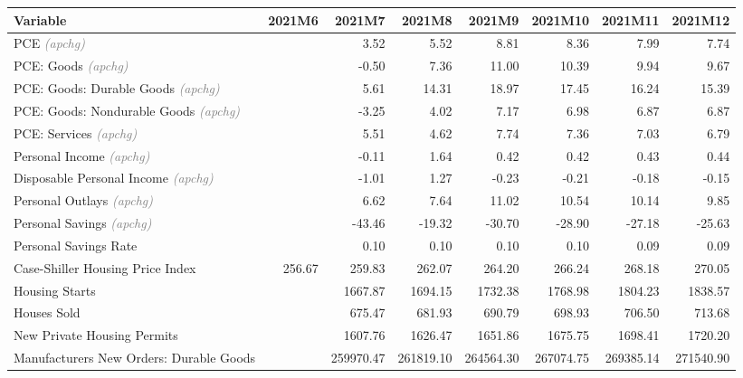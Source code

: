 \documentclass[11pt, letterpaper]{article}\usepackage[]{graphicx}\usepackage[]{color}
\begin{document}
\begin{table}[H]
\centering
\begingroup\fontsize{10pt}{12pt}\selectfont
\begin{tabular}{lrrrrrrr}
  \hline
Variable & 2021M6 & 2021M7 & 2021M8 & 2021M9 & 2021M10 & 2021M11 & 2021M12 \\ 
  \hline
PCE \textit{\footnotesize\textcolor{gray}{(apchg)}} &  & 3.52 & 5.52 & 8.81 & 8.36 & 7.99 & 7.74 \\ 
  PCE: Goods \textit{\footnotesize\textcolor{gray}{(apchg)}} &  & -0.50 & 7.36 & 11.00 & 10.39 & 9.94 & 9.67 \\ 
  PCE: Goods: Durable Goods \textit{\footnotesize\textcolor{gray}{(apchg)}} &  & 5.61 & 14.31 & 18.97 & 17.45 & 16.24 & 15.39 \\ 
  PCE: Goods: Nondurable Goods \textit{\footnotesize\textcolor{gray}{(apchg)}} &  & -3.25 & 4.02 & 7.17 & 6.98 & 6.87 & 6.87 \\ 
  PCE: Services \textit{\footnotesize\textcolor{gray}{(apchg)}} &  & 5.51 & 4.62 & 7.74 & 7.36 & 7.03 & 6.79 \\ 
  Personal Income \textit{\footnotesize\textcolor{gray}{(apchg)}} &  & -0.11 & 1.64 & 0.42 & 0.42 & 0.43 & 0.44 \\ 
  Disposable Personal Income \textit{\footnotesize\textcolor{gray}{(apchg)}} &  & -1.01 & 1.27 & -0.23 & -0.21 & -0.18 & -0.15 \\ 
  Personal Outlays \textit{\footnotesize\textcolor{gray}{(apchg)}} &  & 6.62 & 7.64 & 11.02 & 10.54 & 10.14 & 9.85 \\ 
  Personal Savings \textit{\footnotesize\textcolor{gray}{(apchg)}} &  & -43.46 & -19.32 & -30.70 & -28.90 & -27.18 & -25.63 \\ 
  Personal Savings Rate &  & 0.10 & 0.10 & 0.10 & 0.10 & 0.09 & 0.09 \\ 
  Case-Shiller Housing Price Index & 256.67 & 259.83 & 262.07 & 264.20 & 266.24 & 268.18 & 270.05 \\ 
  Housing Starts &  & 1667.87 & 1694.15 & 1732.38 & 1768.98 & 1804.23 & 1838.57 \\ 
  Houses Sold &  & 675.47 & 681.93 & 690.79 & 698.93 & 706.50 & 713.68 \\ 
  New Private Housing Permits &  & 1607.76 & 1626.47 & 1651.86 & 1675.75 & 1698.41 & 1720.20 \\ 
  Manufacturers New Orders: Durable Goods &  & 259970.47 & 261819.10 & 264564.30 & 267074.75 & 269385.14 & 271540.90 \\ 

\end{tabular}
\end{table}
\end{document}
